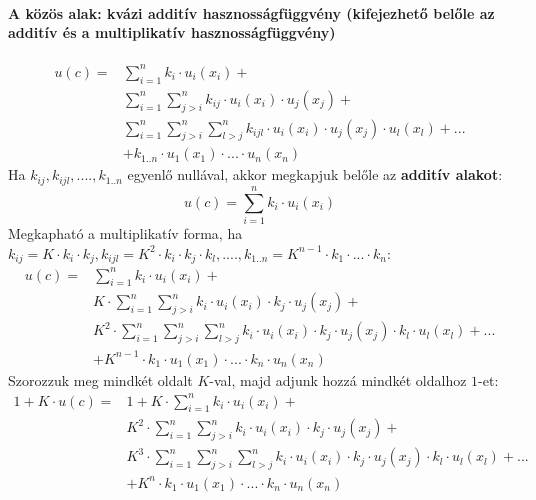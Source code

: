 \documentclass[a4paper,12pt]{article}
\begin{document}
\paragraph{A közös alak: kvázi additív hasznosságfüggvény (kifejezhető belőle az additív és a multiplikatív hasznosságfüggvény)}
\begin{equation}
\begin{split}
u(c) = & \sum_{i=1}^n k_i\cdot u_i(x_i)+ \\
&\sum_{i=1}^n \sum_{j>i}^n k_{ij}\cdot u_i(x_i)\cdot u_j(x_j) + \\
&\sum_{i=1}^n \sum_{j>i}^n \sum_{l>j}^n k_{ijl}\cdot u_i(x_i)\cdot u_j(x_j)\cdot u_l(x_l) + ... \\ 
&+k_{1..n}\cdot u_1(x_1)\cdot  ... \cdot  u_n(x_n)
\end{split}
\end{equation}
Ha $k_{ij}, k_{ijl}, ...., k_{1..n}$ egyenlő nullával, akkor megkapjuk belőle az \textbf{additív alakot}:
\begin{equation}
u(c) =  \sum_{i=1}^n k_i\cdot u_i(x_i)
\end{equation}
Megkapható a multiplikatív forma, ha $k_{ij} = K\cdot k_i\cdot k_j, k_{ijl} = K^2\cdot k_i\cdot k_j\cdot k_l, ...., k_{1..n} = K^{n-1}\cdot k_1\cdot ...\cdot k_n$:
\begin{equation}
\label{multiq}
\begin{split}
u(c) = & \sum_{i=1}^n k_i\cdot u_i(x_i)+ \\
&K\cdot \sum_{i=1}^n \sum_{j>i}^n k_{i}\cdot u_i(x_i)\cdot k_{j}\cdot u_j(x_j) + \\
&K^2\cdot \sum_{i=1}^n \sum_{j>i}^n \sum_{l>j}^n k_{i}\cdot u_i(x_i)\cdot k_{j}\cdot u_j(x_j)\cdot k_{l}\cdot u_l(x_l) + ... \\ 
&+K^{n-1}\cdot k_{1}\cdot u_1(x_1)\cdot  ... \cdot  k_{n} \cdot  u_n(x_n)
\end{split}
\end{equation}
Szorozzuk meg mindkét oldalt $K$-val, majd adjunk hozzá mindkét oldalhoz $1$-et:
\begin{equation}
\begin{split}
1 + K\cdot u(c) = & 1 + K\cdot \sum_{i=1}^n k_i\cdot u_i(x_i)+ \\
&K^2\cdot \sum_{i=1}^n \sum_{j>i}^n k_{i}\cdot u_i(x_i)\cdot k_{j}\cdot u_j(x_j) + \\
&K^3\cdot \sum_{i=1}^n \sum_{j>i}^n \sum_{l>j}^n k_{i}\cdot u_i(x_i)\cdot k_{j}\cdot u_j(x_j)\cdot k_{l}\cdot u_l(x_l) + ... \\ 
&+K^{n}\cdot k_{1}\cdot u_1(x_1)\cdot  ... \cdot  k_{n} \cdot  u_n(x_n)
\end{split}
\end{equation}
\end{document}
